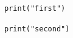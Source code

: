 \documentclass{article}
\begin{document}
\begin{verbatim}
print("first")
\end{verbatim}
\begin{verbatim}
print("second")
\end{verbatim}
\end{document}
